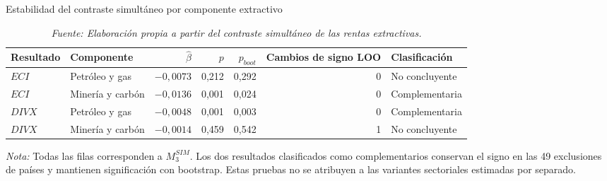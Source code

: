 \documentclass[../../TFM.tex]{subfiles}
\begin{document}
	\begin{table}[htbp]
		\centering
		\small
		\caption{Estabilidad del contraste simultáneo por componente extractivo}
		\label{tab:anexo_desagregacion_peer2}
		\begin{adjustbox}{max width=\textwidth}
		\begin{tabular}{llrrrrl}
			\toprule
			Resultado & Componente & $\hat\beta$ & $p$ & $p_{boot}$ & Cambios de signo LOO & Clasificación \\
			\midrule
			$ECI$ & Petróleo y gas & $-0,0073$ & 0,212 & 0,292 & 0 & No concluyente \\
			$ECI$ & Minería y carbón & $-0,0136$ & 0,001 & 0,024 & 0 & Complementaria \\
			$DIVX$ & Petróleo y gas & $-0,0048$ & 0,001 & 0,003 & 0 & Complementaria \\
			$DIVX$ & Minería y carbón & $-0,0014$ & 0,459 & 0,542 & 1 & No concluyente \\
			\bottomrule
		\end{tabular}
		\end{adjustbox}
		\caption*{\footnotesize \textit{Nota:} Todas las filas corresponden a $M_{3}^{SIM}$. Los dos resultados clasificados como complementarios conservan el signo en las 49 exclusiones de países y mantienen significación con bootstrap. Estas pruebas no se atribuyen a las variantes sectoriales estimadas por separado.}
		\caption*{\footnotesize \textit{Fuente: Elaboración propia a partir del contraste simultáneo de las rentas extractivas.}}
	\end{table}

\end{document}
